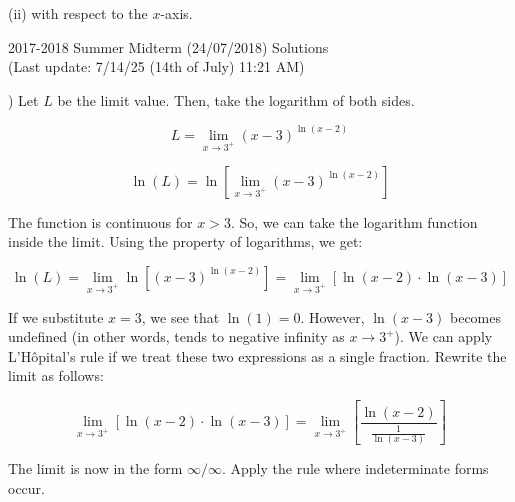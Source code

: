 \documentclass{article}
\begin{document}
\noindent (ii) with respect to the $x$-axis.

\hfill

\newpage

\begin{center}
2017-2018 Summer Midterm (24/07/2018) Solutions\\
(Last update: 7/14/25 (14th of July) 11:21 AM)
\end{center}

) Let $L$ be the limit value. Then, take the logarithm of both sides.

\begin{equation*}L = \lim_{x\to3^+}(x-3)^{\ln(x-2)}\end{equation*}

\begin{equation*}\ln(L) = \ln\left[\lim_{x\to3^+}(x-3)^{\ln(x-2)}\right]\end{equation*}

\hfill

\noindent The function is continuous for $x > 3$. So, we can take the logarithm function inside the limit. Using the property of logarithms, we get:

\begin{equation*}\ln(L) = \lim_{x\to3^+}\ln\left[(x-3)^{\ln(x-2)}\right] = \lim_{x\to3^+}\left[\ln(x-2)\cdot \ln(x-3)\right]\end{equation*}

\hfill

\noindent If we substitute $x=3$, we see that $\ln(1) = 0$. However, $\ln(x-3)$ becomes undefined (in other words, tends to negative infinity as $x\to3^+$). We can apply L'Hôpital's rule if we treat these two expressions as a single fraction. Rewrite the limit as follows:

\begin{equation*}\lim_{x\to3^+}\left[\ln(x-2) \cdot \ln(x-3)\right] =\lim_{x\to3^+}\left[\frac{\ln(x-2)}{\frac{1}{\ln(x-3)}}\right]  \end{equation*}

\hfill

\noindent The limit is now in the form $\infty/\infty$. Apply the rule where indeterminate forms occur.
\end{document}
